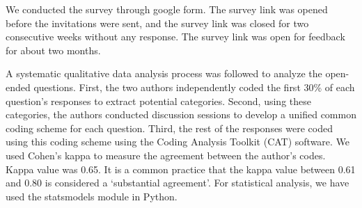 We conducted the survey through google form. The survey link was opened before the invitations were sent, and the survey link was closed for two consecutive weeks without any response. The survey link was open for feedback for about two months. 

A systematic qualitative data analysis process was followed to analyze the open-ended questions. First, the two authors independently coded the first 30\% of each question's responses to extract potential categories. Second, using these categories, the authors conducted discussion sessions to develop a unified common coding scheme for each question. Third, the rest of the responses were coded using this coding scheme using the Coding Analysis Toolkit (CAT)\cite{Lu2008} software. We used Cohen's kappa\cite{Cohen1960} to measure the agreement between the author's codes. Kappa value was 0.65. It is a common practice that the kappa value between 0.61 and 0.80\cite{Landis1977} is considered a `substantial agreement’. For statistical analysis, we have used the statsmodels\cite{seabold2010} module in Python.
 
